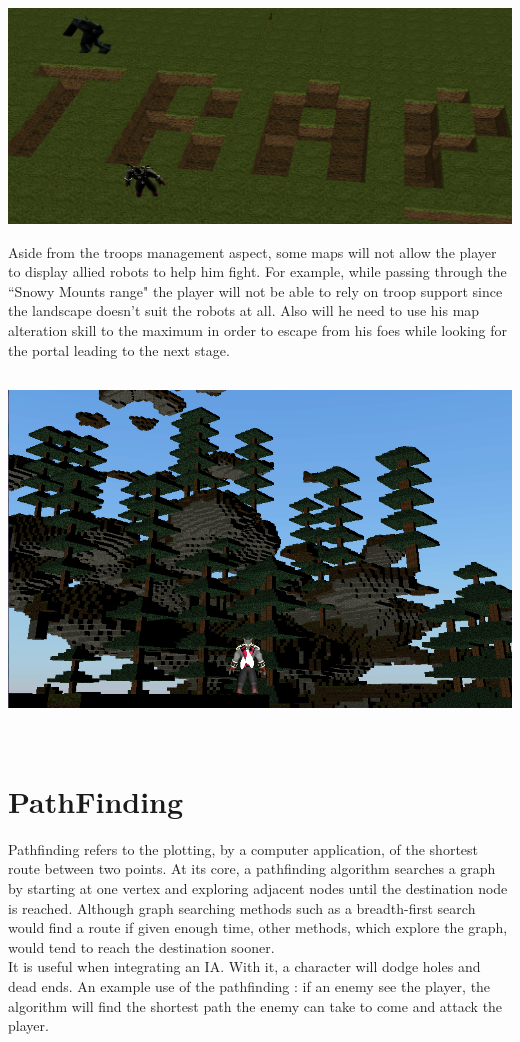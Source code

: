 \documentclass[article]{report}         %
\begin{document}
\includegraphics[width=15cm]{images/trap.png}



  Aside from the troops management aspect, some maps will not allow the player to display allied robots to help him fight. For example, while passing through the ``Snowy Mounts range" the player will not be able to rely on troop support since the landscape doesn't suit the robots at all. Also will he need to use his map alteration skill to the maximum in order to escape from his foes while looking for the portal leading to the next stage.\\

\includegraphics[width=18cm,height=10cm]{images/mountains_view.png}

      \section{PathFinding}
        Pathfinding refers to the plotting, by a computer application, of the shortest route between two points. At its core, a pathfinding algorithm searches a graph by starting at one vertex and exploring adjacent nodes until the destination node is reached. Although graph searching methods such as a breadth-first search would find a route if given enough time, other methods, which explore the graph, would tend to reach the destination sooner. \\
        It is useful when integrating an IA. With it, a character will dodge holes and dead ends. An example use of the pathfinding : if an enemy see the player, the algorithm will find the shortest path the enemy can take to come and attack the player.
        
\end{document}
